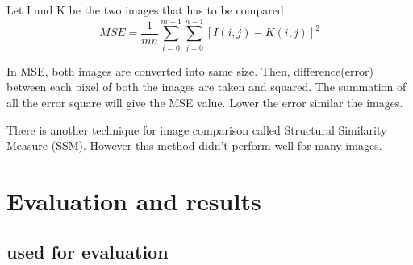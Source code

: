 \documentclass{article}
\begin{document}
 Let I and K be the two images that has to be compared
 \begin{equation}
  MSE = \frac{1}{mn}   \sum^{m-1}_{i=0}  \sum^{n-1}_{j=0} [I(i,j) - K(i,j)] ^2
\end{equation}  

In MSE, both images are converted into same size. Then, difference(error) between each pixel of both the images are taken and squared. The summation of all the error square will give the MSE value. 
Lower the error similar the images. 

There is another technique for image comparison called Structural Similarity Measure (SSM). However this method didn't perform well for many images. 


\section{Evaluation and results}

\subsection{ used for evaluation}
\end{document}

